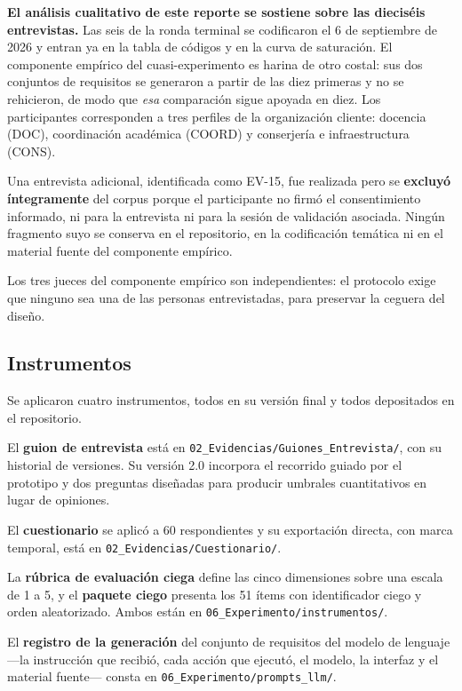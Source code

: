 \documentclass[11pt,a4paper]{article}
\begin{document}
\textbf{El an\'alisis cualitativo de este reporte se sostiene sobre las diecis\'eis
entrevistas.} Las seis de la ronda terminal se codificaron el 6 de septiembre de 2026 y
entran ya en la tabla de c\'odigos y en la curva de saturaci\'on. El componente
emp\'irico del cuasi-experimento es harina de otro costal: sus dos conjuntos de
requisitos se generaron a partir de las diez primeras y no se rehicieron, de modo que
\emph{esa} comparaci\'on sigue apoyada en diez.
Los participantes corresponden a tres perfiles de la organizaci\'on cliente: docencia
(DOC), coordinaci\'on acad\'emica (COORD) y conserjer\'ia e infraestructura (CONS).

Una entrevista adicional, identificada como EV-15, fue realizada pero se
\textbf{excluy\'o \'integramente} del corpus porque el participante no firm\'o el
consentimiento informado, ni para la entrevista ni para la sesi\'on de validaci\'on
asociada. Ning\'un fragmento suyo se conserva en el repositorio, en la codificaci\'on
tem\'atica ni en el material fuente del componente emp\'irico.

Los tres jueces del componente emp\'irico son independientes: el protocolo exige que
ninguno sea una de las personas entrevistadas, para preservar la ceguera del dise\~no.

\subsection{Instrumentos}

Se aplicaron cuatro instrumentos, todos en su versi\'on final y todos depositados en el
repositorio.

El \textbf{guion de entrevista} est\'a en \texttt{02\_Evidencias/Guiones\_Entrevista/},
con su historial de versiones. Su versi\'on 2.0 incorpora el recorrido
guiado por el prototipo y dos preguntas dise\~nadas para producir umbrales
cuantitativos en lugar de opiniones.

El \textbf{cuestionario} se aplic\'o a 60 respondientes y su exportaci\'on directa, con
marca temporal, est\'a en \texttt{02\_Evidencias/Cuestionario/}.

La \textbf{r\'ubrica de evaluaci\'on ciega} define las cinco dimensiones sobre una
escala de 1 a 5, y el \textbf{paquete ciego} presenta los 51 \'items con identificador
ciego y orden aleatorizado. Ambos est\'an en
\texttt{06\_Experimento/instrumentos/}.

El \textbf{registro de la generaci\'on} del conjunto de requisitos del modelo de
lenguaje ---la instrucci\'on que recibi\'o, cada acci\'on que ejecut\'o, el modelo, la interfaz y el
material fuente--- consta en \texttt{06\_Experimento/prompts\_llm/}.
\end{document}
